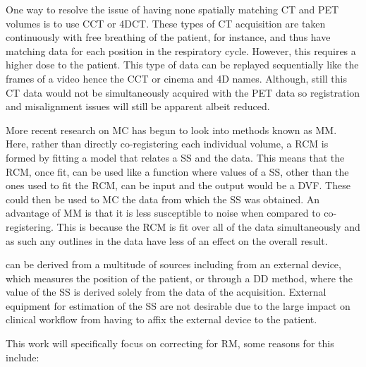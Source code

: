         One way to resolve the issue of having none spatially matching \gls{CT} and \gls{PET} volumes is to use \gls{CCT} or \gls{4DCT}. These types of \gls{CT} acquisition are taken continuously with free breathing of the patient, for instance, and thus have matching data for each position in the respiratory cycle. However, this requires a higher dose to the patient. This type of data can be replayed sequentially like the frames of a video hence the \gls{CCT} or cinema and \gls{4D} names. Although, still this \gls{CT} data would not be simultaneously acquired with the \gls{PET} data so registration and misalignment issues will still be apparent albeit reduced. 
        
        More recent research on \gls{MC} has begun to look into methods known as \gls{MM}. Here, rather than directly co-registering each individual volume, a \gls{RCM} is formed by fitting a model that relates a \gls{SS} and the data. This means that the \gls{RCM}, once fit, can be used like a function where values of a \gls{SS}, other than the ones used to fit the \gls{RCM}, can be input and the output would be a \gls{DVF}. These  could then be used to \gls{MC} the data from which the \gls{SS} was obtained. An advantage of \gls{MM} is that it is less susceptible to noise when compared to co-registering. This is because the \gls{RCM} is fit over all of the data simultaneously and as such any outlines in the data have less of an effect on the overall result.
    
         can be derived from a multitude of sources including from an external device, which measures the position of the patient, or through a \gls{DD} method, where the value of the \gls{SS} is derived solely from the data of the acquisition. External equipment for estimation of the \gls{SS} are not desirable due to the large impact on clinical workflow from having to affix the external device to the patient. %
            
        This work will specifically focus on correcting for \gls{RM}, some reasons for this include:
            
